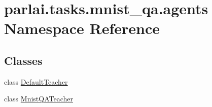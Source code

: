 \hypertarget{namespaceparlai_1_1tasks_1_1mnist__qa_1_1agents}{}\section{parlai.\+tasks.\+mnist\+\_\+qa.\+agents Namespace Reference}
\label{namespaceparlai_1_1tasks_1_1mnist__qa_1_1agents}
\subsection*{Classes}
\begin{DoxyCompactItemize}
\item 
class \hyperlink{classparlai_1_1tasks_1_1mnist__qa_1_1agents_1_1DefaultTeacher}{Default\+Teacher}
\item 
class \hyperlink{classparlai_1_1tasks_1_1mnist__qa_1_1agents_1_1MnistQATeacher}{Mnist\+Q\+A\+Teacher}
\end{DoxyCompactItemize}
